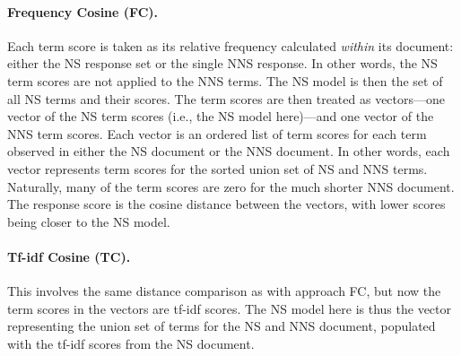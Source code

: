 \paragraph{Frequency Cosine (FC).} Each term score is taken as its relative frequency calculated \textit{within} its document: either the NS response set or the single NNS response. In other words, the NS term scores are not applied to the NNS terms. The NS model is then the set of all NS terms and their scores. The term scores are then treated as vectors---one vector of the NS term scores (i.e., the NS model here)---and one vector of the NNS term scores. Each vector is an ordered list of term scores for each term observed in either the NS document or the NNS document. In other words, each vector represents term scores for the sorted union set of NS and NNS terms. Naturally, many of the term scores are zero for the much shorter NNS document. The response score is the cosine distance between the vectors, with lower scores being closer to the NS model.

\paragraph{Tf-idf Cosine (TC).} This involves the same distance comparison as with approach FC, but now the term scores in the vectors are tf-idf scores. The NS model here is thus the vector representing the union set of terms for the NS and NNS document, populated with the tf-idf scores from the NS document.

\bigskip

